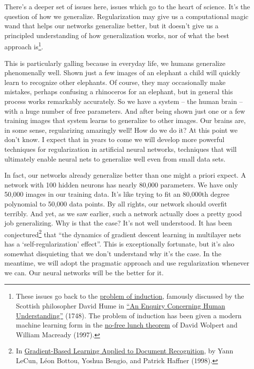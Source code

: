 \documentclass[a4paper,twoside,10pt]{book}
\begin{document}
There's a deeper set of issues here, issues which go to the heart of science. It's the question of how we generalize. Regularization may give us a computational magic wand that helps our networks generalize better, but it doesn't give us a principled understanding of how generalization works, nor of what the best approach is\footnote{These issues go back to the \href{http://en.wikipedia.org/wiki/Problem_of_induction}{problem of induction}, famously discussed by the Scottish philosopher David Hume in \href{http://www.gutenberg.org/ebooks/9662}{``An Enquiry Concerning Human Understanding''} (1748). The problem of induction has been given a modern machine learning form in the \href{http://ieeexplore.ieee.org/xpl/articleDetails.jsp?tp=&arnumber=585893}{no-free lunch theorem} of David Wolpert and William Macready (1997).}.

This is particularly galling because in everyday life, we humans generalize phenomenally well. Shown just a few images of an elephant a child will quickly learn to recognize other elephants. Of course, they may occasionally make mistakes, perhaps confusing a rhinoceros for an elephant, but in general this process works remarkably accurately. So we have a system -- the human brain -- with a huge number of free parameters. And after being shown just one or a few training images that system learns to generalize to other images. Our brains are, in some sense, regularizing amazingly well! How do we do it? At this point we don't know. I expect that in years to come we will develop more powerful techniques for regularization in artificial neural networks, techniques that will ultimately enable neural nets to generalize well even from small data sets.

In fact, our networks already generalize better than one might a priori expect. A network with 100 hidden neurons has nearly 80,000 parameters. We have only 50,000 images in our training data. It's like trying to fit an 80,000th degree polynomial to 50,000 data points. By all rights, our network should overfit terribly. And yet, as we saw earlier, such a network actually does a pretty good job generalizing. Why is that the case? It's not well understood. It has been conjectured\footnote{In \href{http://yann.lecun.com/exdb/publis/pdf/lecun-01a.pdf}{Gradient-Based Learning Applied to Document Recognition}, by Yann LeCun, L\'{e}on Bottou, Yoshua Bengio, and Patrick Haffner (1998).} that ``the dynamics of gradient descent learning in multilayer nets has a `self-regularization' effect''. This is exceptionally fortunate, but it's also somewhat disquieting that we don't understand why it's the case. In the meantime, we will adopt the pragmatic approach and use regularization whenever we can. Our neural networks will be the better for it.
\end{document}
